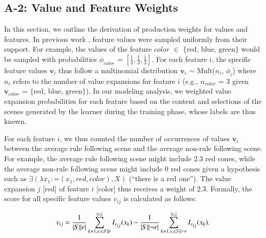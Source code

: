 \documentclass[doc,natbib,floatsintext]{apa7}
\begin{document}
\begin{appendices}
\subsection{A-2: Value and Feature Weights}\label{ap:a2_value_and_feat_weights}

In this section, we outline the derivation of production weights for values and features. In previous work \citep{bramley2018grounding}, feature values were sampled uniformly from their support. For example, the values of the feature  $color$ \(\in\) $\{\text{red, blue, green}\}$ would be sampled with probabilities \(\phi_{color}\) = \([\frac{1}{3},\frac{1}{3},\frac{1}{3}]\). For each feature \(i\), the specific feature values \(\textbf{v}_{i}\) thus follow a multinomial distribution \(\textbf{v}_{i}\) $\sim$ Mult(\(n_{i}\), \(\phi_{i}\)) where \(n_{i}\) refers to the number of value expansions for feature $i$ (e.g., \(n_{color}\) = 3 given \(\textbf{v}_{color}\) = $\{\text{red, blue, green}\}$). In our modeling analysis, we weighted value expansion probabilities for each feature based on the content and selections of the scenes generated by the learner during the training phase, whose labels are thus known.

For each feature \(i\), we thus counted the number of occurrences of values \(\textbf{v}_{i}\) between the average rule following scene and the average non-rule following scene. For example, the average rule following scene might include 2.3 red cones, while the average non-rule following scene might include 0 red cones given a hypothesis such as \(\exists(\lambda x_{1}: \text{=}(x_{1},red,color), X)\) (``there is a red one''). The value expansion \(j\) [red] of feature \(i\) [color] thus receives a weight of 2.3. Formally, the score for all specific feature values \(v_{ij}\) is calculated as follows:

\begin{equation}
    v_{ij} =  \frac{1}{|S||r|}\sum_{k = 1, v_{i} \in S||r}^{|v_{i}|} {I}_{v\textsubscript{$ij$}}(x_{k}) -  \frac{1}{|S||\neg r|}\sum_{k = 1, v_{i} \in S||\neg r}^{|v_{i}|}{I}_{v\textsubscript{$ij$}}(x_{k}).
\label{equ:equ_a2_1_value_score}
\end{equation}



\end{appendices}
\end{document}
